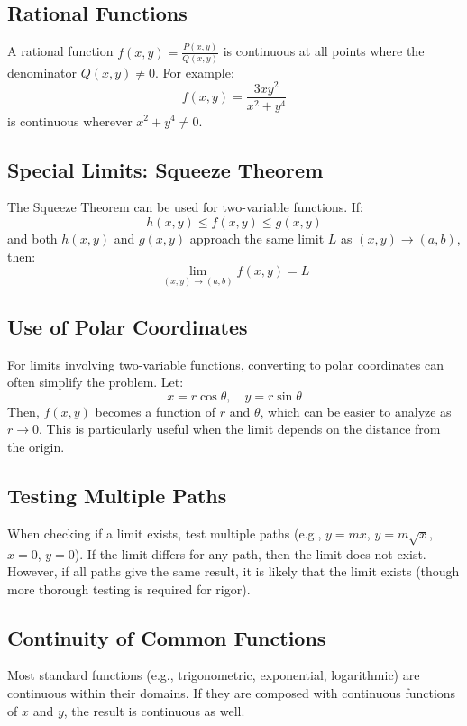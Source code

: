 \documentclass{report}
\begin{document}
\subsection{Rational Functions}
A rational function $f(x, y) = \frac{P(x, y)}{Q(x, y)}$ is continuous at all points where the denominator $Q(x, y) \neq 0$. For example:
\[
	f(x, y) = \frac{3x y^2}{x^2 + y^4}
\]
is continuous wherever $x^2 + y^4 \neq 0$.


\subsection{Special Limits: Squeeze Theorem}
The Squeeze Theorem can be used for two-variable functions. If:
\[
	h(x, y) \leq f(x, y) \leq g(x, y)
\]
and both $h(x, y)$ and $g(x, y)$ approach the same limit $L$ as $(x, y) \to (a, b)$, then:
\[
	\lim_{(x, y) \to (a, b)} f(x, y) = L
\]

\subsection{Use of Polar Coordinates}
For limits involving two-variable functions, converting to polar coordinates can often simplify the problem. Let:
\[
	x = r \cos \theta, \quad y = r \sin \theta
\]
Then, $f(x, y)$ becomes a function of $r$ and $\theta$, which can be easier to analyze as $r \to 0$. This is particularly useful when the limit depends on the distance from the origin.

\subsection{Testing Multiple Paths}
When checking if a limit exists, test multiple paths (e.g., $y = mx$, $y = m\sqrt{x}$, $x = 0$, $y = 0$). If the limit differs for any path, then the limit does not exist. However, if all paths give the same result, it is likely that the limit exists (though more thorough testing is required for rigor).

\subsection{Continuity of Common Functions}
Most standard functions (e.g., trigonometric, exponential, logarithmic) are continuous within their domains. If they are composed with continuous functions of $x$ and $y$, the result is continuous as well.
\end{document}
